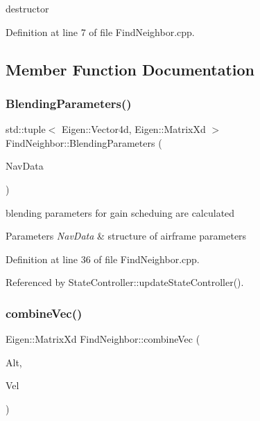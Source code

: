 destructor 



Definition at line 7 of file Find\+Neighbor.\+cpp.



\subsection{Member Function Documentation}
\mbox{\label{class_find_neighbor_a27221e3b251af3c4e7ccccb660d412ea}} 
\subsubsection{\texorpdfstring{Blending\+Parameters()}{BlendingParameters()}}
{\footnotesize\ttfamily std\+::tuple$<$ Eigen\+::\+Vector4d, Eigen\+::\+Matrix\+Xd $>$ Find\+Neighbor\+::\+Blending\+Parameters (\begin{DoxyParamCaption}\item[{Navigation\+Struct \&}]{Nav\+Data }\end{DoxyParamCaption})}



blending parameters for gain scheduing are calculated 


\begin{DoxyParams}{Parameters}
{\em Nav\+Data} & structure of airframe parameters \\
\hline
\end{DoxyParams}


Definition at line 36 of file Find\+Neighbor.\+cpp.



Referenced by State\+Controller\+::update\+State\+Controller().

\mbox{\label{class_find_neighbor_ac0133668987495831b577fefb8bdca50}} 
\subsubsection{\texorpdfstring{combine\+Vec()}{combineVec()}}
{\footnotesize\ttfamily Eigen\+::\+Matrix\+Xd Find\+Neighbor\+::combine\+Vec (\begin{DoxyParamCaption}\item[{Eigen\+::\+Vector2d \&}]{Alt,  }\item[{Eigen\+::\+Vector2d \&}]{Vel }\end{DoxyParamCaption})}



